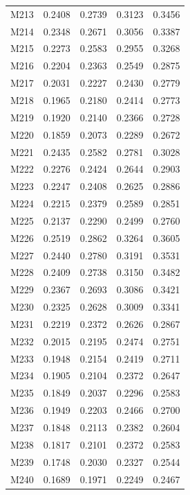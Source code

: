 \begin{longtable}{lrrrr}
M213 & 0.2408 & 0.2739 & 0.3123 & 0.3456 \\
M214 & 0.2348 & 0.2671 & 0.3056 & 0.3387 \\
M215 & 0.2273 & 0.2583 & 0.2955 & 0.3268 \\
M216 & 0.2204 & 0.2363 & 0.2549 & 0.2875 \\
M217 & 0.2031 & 0.2227 & 0.2430 & 0.2779 \\
M218 & 0.1965 & 0.2180 & 0.2414 & 0.2773 \\
M219 & 0.1920 & 0.2140 & 0.2366 & 0.2728 \\
M220 & 0.1859 & 0.2073 & 0.2289 & 0.2672 \\
M221 & 0.2435 & 0.2582 & 0.2781 & 0.3028 \\
M222 & 0.2276 & 0.2424 & 0.2644 & 0.2903 \\
M223 & 0.2247 & 0.2408 & 0.2625 & 0.2886 \\
M224 & 0.2215 & 0.2379 & 0.2589 & 0.2851 \\
M225 & 0.2137 & 0.2290 & 0.2499 & 0.2760 \\
M226 & 0.2519 & 0.2862 & 0.3264 & 0.3605 \\
M227 & 0.2440 & 0.2780 & 0.3191 & 0.3531 \\
M228 & 0.2409 & 0.2738 & 0.3150 & 0.3482 \\
M229 & 0.2367 & 0.2693 & 0.3086 & 0.3421 \\
M230 & 0.2325 & 0.2628 & 0.3009 & 0.3341 \\
M231 & 0.2219 & 0.2372 & 0.2626 & 0.2867 \\
M232 & 0.2015 & 0.2195 & 0.2474 & 0.2751 \\
M233 & 0.1948 & 0.2154 & 0.2419 & 0.2711 \\
M234 & 0.1905 & 0.2104 & 0.2372 & 0.2647 \\
M235 & 0.1849 & 0.2037 & 0.2296 & 0.2583 \\
M236 & 0.1949 & 0.2203 & 0.2466 & 0.2700 \\
M237 & 0.1848 & 0.2113 & 0.2382 & 0.2604 \\
M238 & 0.1817 & 0.2101 & 0.2372 & 0.2583 \\
M239 & 0.1748 & 0.2030 & 0.2327 & 0.2544 \\
M240 & 0.1689 & 0.1971 & 0.2249 & 0.2467 \\
\end{longtable}
